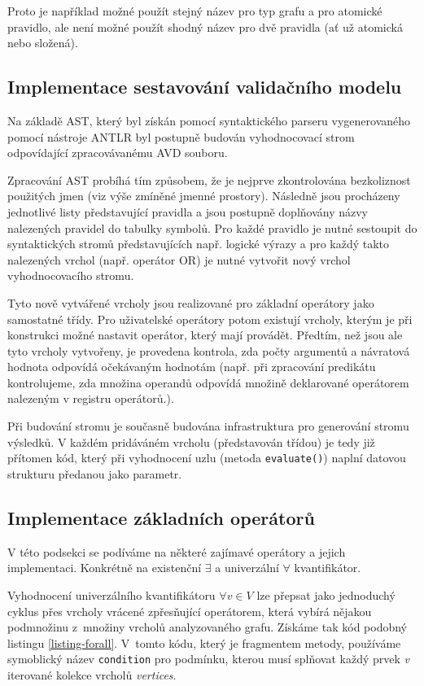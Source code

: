 Proto je například možné použít stejný název pro typ grafu a pro atomické pravidlo, ale není možné použít shodný název pro dvě pravidla (ať už atomická nebo složená).

\subsection{Implementace sestavování validačního modelu}
Na základě AST, který byl získán pomocí syntaktického parseru vygenerovaného pomocí nástroje ANTLR byl postupně budován vyhodnocovací strom odpovídající zpracovávanému AVD souboru.

Zpracování AST probíhá tím způsobem, že je nejprve zkontrolována bezkoliznost použitých jmen (viz výše zmíněné jmenné prostory). Následně jsou procházeny jednotlivé listy představující pravidla a jsou postupně doplňovány názvy nalezených pravidel do tabulky symbolů. Pro každé pravidlo je nutné sestoupit do syntaktických stromů představujících např. logické výrazy a pro každý takto nalezených vrchol (např. operátor OR) je nutné vytvořit nový vrchol vyhodnocovacího stromu.

Tyto nově vytvářené vrcholy jsou realizované pro základní operátory jako samostatné třídy. Pro uživatelské operátory potom existují vrcholy, kterým je při konstrukci možné nastavit operátor, který mají provádět. Předtím, než jsou ale tyto vrcholy vytvořeny, je provedena kontrola, zda počty argumentů a návratová hodnota odpovídá očekávaným hodnotám (např. při zpracování predikátu kontrolujeme, zda množina operandů odpovídá množině deklarované operátorem nalezeným v registru operátorů.).

Při budování stromu je současně budována infrastruktura pro generování stromu výsledků. V každém pridáváném vrcholu (představován třídou) je tedy již přítomen kód, který při vyhodnocení uzlu (metoda \verb-evaluate()-) naplní datovou strukturu předanou jako parametr.

\subsection{Implementace základních operátorů}
V této podsekci se podíváme na některé zajímavé operátory a jejich implementaci. Konkrétně na existenční $\exists$ a univerzální $\forall$ kvantifikátor.

Vyhodnocení univerzálního kvantifikátoru $\forall v \in V$ lze přepsat jako jednoduchý cyklus přes vrcholy vrácené zpřesňující operátorem, která vybírá nějakou podmnožinu z~množiny vrcholů analyzovaného grafu. Získáme tak kód podobný listingu \ref{listing-forall}. V~tomto kódu, který je fragmentem metody, používáme symoblický název \verb+condition+ pro podmínku, kterou musí splňovat každý prvek \emph{v} iterované kolekce vrcholů \emph{vertices}.

